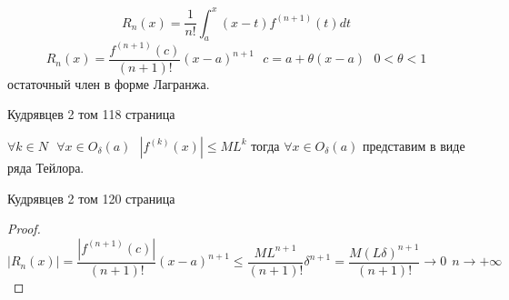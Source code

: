 \begin{define}
  $$
  R_n(x) = \frac{1}{n!} \int_a^x (x - t) f^{(n+1)}(t)dt
  $$
  $$
  R_n(x) = \frac{f^{(n+1)}(c)}{(n+1)!} (x - a)^{n+1} ~~~
  c = a + \theta(x-a) ~~~ 0 < \theta < 1
  $$
  остаточный член в форме Лагранжа.

  Кудрявцев 2 том 118 страница
\end{define}

\begin{theorem}
  $\forall k \in N ~~~ \forall x \in O_{\delta}(a) ~~~ |f^{(k)}(x)| \le M L^k$
  тогда $\forall x \in O_{\delta}(a)$ представим в виде ряда Тейлора.

  Кудрявцев 2 том 120 страница
\end{theorem}

\begin{proof}
  $$
  |R_n(x)| = \frac{| f^{(n+1)}(c) |}{(n+1)!} (x-a)^{n+1} \le
  \frac{ML^{n+1}}{(n+1)!} \delta^{n+1} =
  \frac{ M (L\delta)^{n+1} }{(n+1)!} \to 0 ~~ n \to +\infty
  $$
\end{proof}
